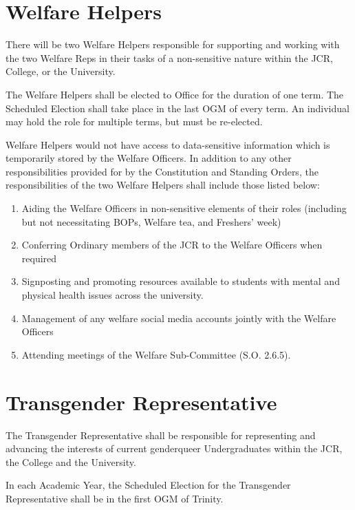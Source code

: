 \section{Welfare Helpers}
\npara There will be two Welfare Helpers responsible for supporting and working with the two Welfare Reps in their tasks of a non-sensitive nature within the JCR, College, or the University.

\npara The Welfare Helpers shall be elected to Office for the duration of one term. The Scheduled Election shall take place in the last OGM of every term. An individual may hold the role for multiple terms, but must be re-elected.

\npara Welfare Helpers would not have access to data-sensitive information which is temporarily stored by the Welfare Officers.
\npara In addition to any other responsibilities provided for by the Constitution and Standing Orders, the responsibilities of the two Welfare Helpers shall include those listed below: 
\begin{enumerate}
    \item Aiding the Welfare Officers in non-sensitive elements of their roles (including but not necessitating BOPs, Welfare tea, and Freshers’ week) 
    \item Conferring Ordinary members of the JCR to the Welfare Officers when required
    \item Signposting and promoting resources available to students with mental and physical health issues across the university.
    \item Management of any welfare social media accounts jointly with the Welfare Officers
    \item Attending meetings of the Welfare Sub-Committee (S.O. 2.6.5).
\end{enumerate}

\section{Transgender Representative}
\npara The Transgender Representative shall be responsible for representing and advancing the interests of current genderqueer Undergraduates within the JCR, the College and the University.

\npara In each Academic Year, the Scheduled Election for the Transgender Representative shall be in the first OGM of Trinity.

